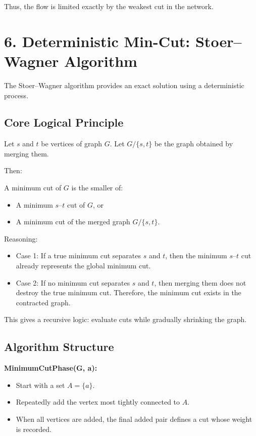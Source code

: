 \documentclass[12pt]{article}
\begin{document}
Thus, the flow is limited exactly by the weakest cut in the network.

\section*{6. Deterministic Min-Cut: Stoer–Wagner Algorithm}

The Stoer–Wagner algorithm provides an exact solution using a deterministic process.

\subsection*{Core Logical Principle}

Let $s$ and $t$ be vertices of graph $G$. Let $G/\{s,t\}$ be the graph obtained by merging them.

Then:

A minimum cut of $G$ is the smaller of:
\begin{itemize}
\item A minimum $s$–$t$ cut of $G$, or
\item A minimum cut of the merged graph $G/\{s,t\}$.
\end{itemize}

Reasoning:

\begin{itemize}
\item Case 1: If a true minimum cut separates $s$ and $t$, then the minimum $s$–$t$ cut already represents the global minimum cut.
\item Case 2: If no minimum cut separates $s$ and $t$, then merging them does not destroy the true minimum cut. Therefore, the minimum cut exists in the contracted graph.
\end{itemize}

This gives a recursive logic: evaluate cuts while gradually shrinking the graph.

\subsection*{Algorithm Structure}

\textbf{MinimumCutPhase(G, a):}
\begin{itemize}
\item Start with a set $A = \{a\}$.
\item Repeatedly add the vertex most tightly connected to $A$.
\item When all vertices are added, the final added pair defines a cut whose weight is recorded.
\end{itemize}
\end{document}
